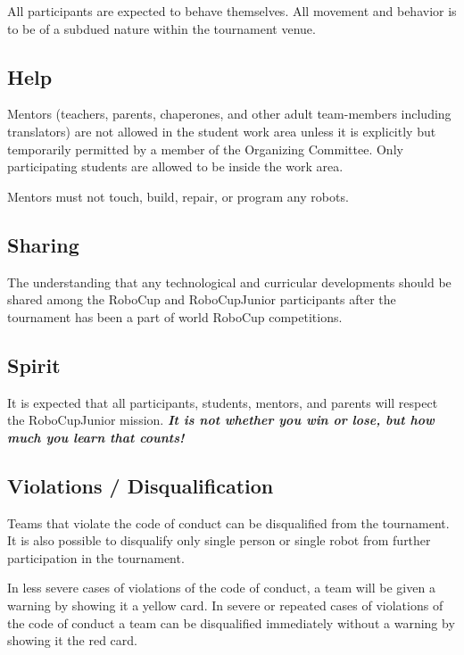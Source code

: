 \documentclass{article}
\begin{document}
All participants are expected to behave themselves. All movement and behavior
is to be of a subdued nature within the tournament venue.

\subsection{ Help \label{ref-043}}

Mentors (teachers, parents, chaperones, and other adult team-members including
translators) are not allowed in the student work area unless it is explicitly
but temporarily permitted by a member of the Organizing Committee. Only
participating students are allowed to be inside the work area.

Mentors must not touch, build, repair, or program any robots.

\subsection{ Sharing \label{ref-044}}

The understanding that any technological and curricular developments should be
shared among the RoboCup and RoboCupJunior participants after the tournament
has been a part of world RoboCup competitions.

\subsection{ Spirit \label{ref-045}}

It is expected that all participants, students, mentors, and parents will
respect the RoboCupJunior mission. \textbf{\textit{It is not whether you win or
lose, but how much you learn that counts!}}

\subsection{ Violations / Disqualification \label{ref-046}}

Teams that violate the code of conduct can be disqualified from the tournament.
It is also possible to disqualify only single person or single robot from
further participation in the tournament.

In less severe cases of violations of the code of conduct, a team will be given
a warning by showing it a yellow card. In severe or repeated cases of
violations of the code of conduct a team can be disqualified immediately
without a warning by showing it the red card.
\end{document}

